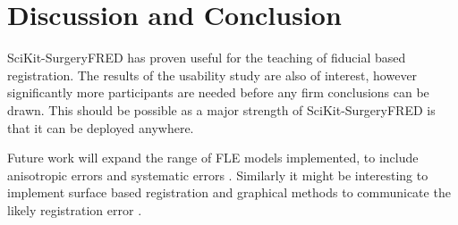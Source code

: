 \section{Discussion and Conclusion}
SciKit-SurgeryFRED has proven useful for the teaching of fiducial based registration. The results of the usability study 
are also of interest, however significantly more participants are needed before any firm conclusions can be drawn. This 
should be possible as a major strength of SciKit-SurgeryFRED is that it can be deployed anywhere. 

Future work will expand the range of \gls{FLE} models implemented, to include anisotropic \cite{4359072} 
errors and systematic errors \cite{6294449}. Similarly it might be interesting to implement surface based 
registration and graphical methods to communicate the likely registration error \cite{PMID:29663273}.







